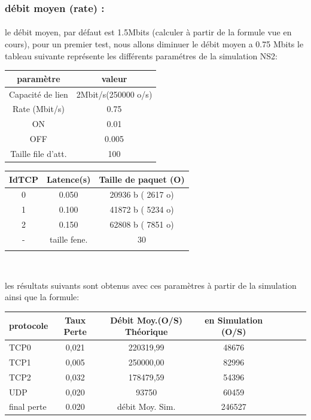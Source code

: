 \documentclass[a4paper]{report}
\theoremstyle{definition}
\begin{document}
\subsubsection*{débit moyen (rate) :}
\paragraph*{}
	le débit moyen, par défaut est 1.5Mbits (calculer à partir de la formule vue en cours),
	pour un premier test, nous allons diminuer le débit moyen a 0.75 Mbits
	le tableau suivante représente les différents paramétres de la simulation NS2:
	\begin{center}
	

\begin{tabular}{|c|c|}
\hline
 paramètre  & valeur \\ \hline
 
 Capacité de lien & 2Mbit/s(250000 o/s) \\ 
 Rate (Mbit/s) & 0.75 \\ 
 ON & 0.01\\ 
 OFF & 0.005 \\ 
 Taille file d'att. & 100\\
\hline
\end{tabular}
\begin{tabular}{|c|c|c|}
\hline
 IdTCP  & Latence(s) & Taille de paquet (O) \\ \hline
 
 0 & 0.050 & 20936 b ( 2617 o)	 \\ 
 1 & 0.100 & 41872 b ( 5234 o)	 \\ 
 2 & 0.150 & 62808 b ( 7851 o)	 \\ 
 - & taille fene. & 30\\ 
&&\\ 
\hline
\end{tabular}\\
	\end{center}
les résultats suivants sont obtenus avec ces paramètres à partir de la simulation ainsi que la formule: \\
\begin{center}
\begin{tabular}{|l|c|c|c|c|c|c|c|}
\hline
 protocole & Taux Perte & Débit Moy.(O/S) Théorique & en Simulation (O/S) \\ \hline
 TCP0 & 0,021 &  220319,99 &  48676     \\
 TCP1 & 0,005 &  250000,00 &  82996     \\ 
 TCP2 & 0,032 &  178479,59 &  54396     \\ 
 UDP  & 0,020 &  93750     &  60459 \\ 
 \hline
 final perte & 0.020  & débit Moy. Sim. & 246527   \\ 
\hline
\end{tabular}
\end{center}
\end{document}
